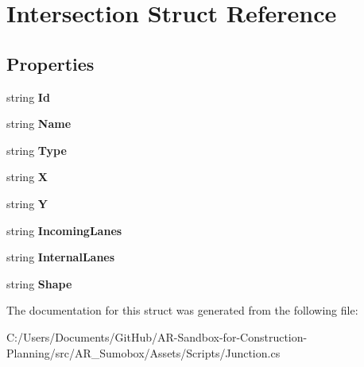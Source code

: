 \hypertarget{struct_intersection}{}\section{Intersection Struct Reference}
\label{struct_intersection}
\subsection*{Properties}
\begin{DoxyCompactItemize}
\item 
\mbox{\label{struct_intersection_ad181fd7378c0e2e8715b8635e1c9b79a}} 
string {\bfseries Id}
\item 
\mbox{\label{struct_intersection_a8d641dda6ee215860775a15654cea8de}} 
string {\bfseries Name}
\item 
\mbox{\label{struct_intersection_a6b64133c8d59bf11d9dca264bffbb2e2}} 
string {\bfseries Type}
\item 
\mbox{\label{struct_intersection_aeaeaf79a42ec4ecf71690024dd29e12d}} 
string {\bfseries X}
\item 
\mbox{\label{struct_intersection_ad5bd18b301f871c86b9398925185e389}} 
string {\bfseries Y}
\item 
\mbox{\label{struct_intersection_a4364014b7b0f5a20778002424a40644f}} 
string {\bfseries Incoming\+Lanes}
\item 
\mbox{\label{struct_intersection_a3c3a3d7a4b420f252235525b777e5d76}} 
string {\bfseries Internal\+Lanes}
\item 
\mbox{\label{struct_intersection_a9c4018f9c84d2ced41d09556b1af3b99}} 
string {\bfseries Shape}
\end{DoxyCompactItemize}


The documentation for this struct was generated from the following file\+:\begin{DoxyCompactItemize}
\item 
C\+:/\+Users/\+Documents/\+Git\+Hub/\+A\+R-\/\+Sandbox-\/for-\/\+Construction-\/\+Planning/src/\+A\+R\+\_\+\+Sumobox/\+Assets/\+Scripts/Junction.\+cs\end{DoxyCompactItemize}
